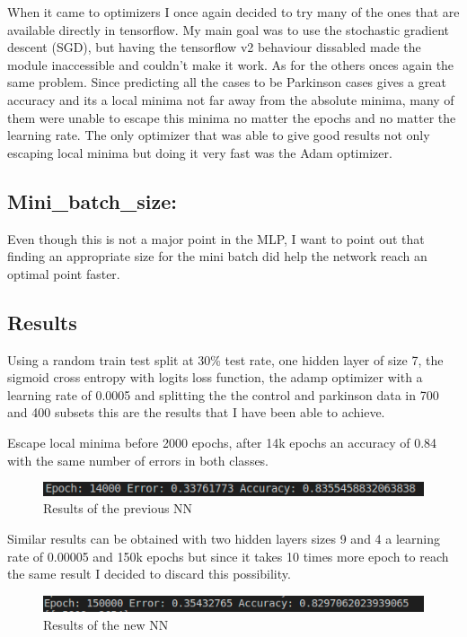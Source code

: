 \documentclass{article} %
\begin{document}
When it came to optimizers I once again decided to try many of the ones that are available directly in tensorflow. My main goal was to use the stochastic gradient descent (SGD), but having the tensorflow v2 behaviour dissabled made the module inaccessible and couldn't make it work. As for the others onces again the same problem. Since predicting all the cases to be Parkinson cases gives a great accuracy and its a local minima not far away from the absolute minima, many of them were unable to escape this minima no matter the epochs and no matter the learning rate. The only optimizer that was able to give good results not only escaping local minima but doing it very fast was the Adam optimizer.

\subsection*{Mini\_batch\_size:}

Even though this is not a major point in the MLP, I want to point out that finding an appropriate size for the mini batch did help the network reach an optimal point faster.


\bigskip
\subsection{Results}

Using a random train test split at 30\% test rate, one hidden layer of size 7, the sigmoid cross entropy with logits loss function, the adamp optimizer with a learning rate of 0.0005 and splitting the the control and parkinson data in 700 and 400 subsets this are the results that I have been able to achieve.

Escape local minima before 2000 epochs, after 14k epochs an accuracy of 0.84 with the same number of errors in both classes.
\begin{figure}[h!]
  \includegraphics[scale = 1]{epoch14.png}
  \centering
  \caption{Results of the previous NN}\hspace*{\fill}
  \label{fig:a}
\end{figure}

Similar results can be obtained with two hidden layers sizes 9 and 4 a learning rate of 0.00005 and 150k epochs but since it takes 10 times more epoch to reach the same result I decided to discard this possibility. 

\begin{figure}[h!]
  \includegraphics[scale = 1]{epoch150.png}
  \centering
  \caption{Results of the new NN}\hspace*{\fill}
  \label{fig:a}
\end{figure}
\end{document}
